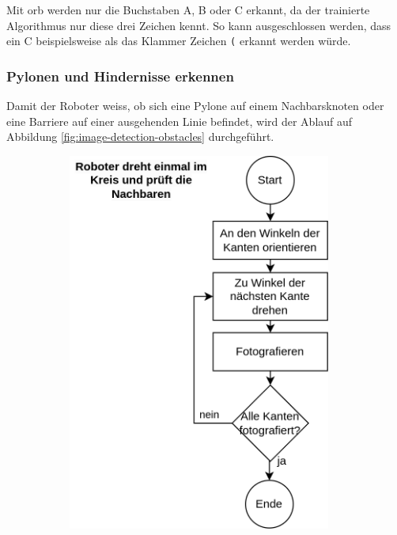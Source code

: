 Mit \acrshort{orb} werden nur die Buchstaben A, B oder C erkannt, da der trainierte Algorithmus nur diese drei Zeichen kennt. So kann ausgeschlossen werden, dass ein C beispielsweise als das Klammer Zeichen \verb|(| erkannt werden würde.


\subsubsection{Pylonen und Hindernisse erkennen}\label{subsubsection:bilderkennung}

Damit der Roboter weiss, ob sich eine Pylone auf einem Nachbarsknoten oder eine Barriere auf einer ausgehenden Linie befindet, wird der Ablauf auf Abbildung \ref{fig:image-detection-obstacles} durchgeführt.

\begin{figure}[H]
\centering
\begin{subfigure}{0.45\textwidth}
\centering
\includegraphics[width=0.95\textwidth]{assets/gesamtkonzept/ablaufdiagramm-hindernisse-erkennen.png}

\end{subfigure}
\end{figure}
